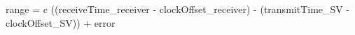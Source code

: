 range = c ((receiveTime_{receiver} - clockOffset_{receiver}) - (transmitTime_{SV} - clockOffset_{SV})) + error